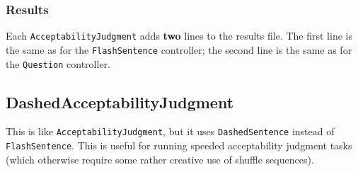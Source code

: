 \documentclass[11pt,letterpaper]{article}
\begin{document}
\normalsize

\subsubsection*{Results}

Each \texttt{AcceptabilityJudgment} adds \textbf{two} lines to the results file. The first
line is the same as for the \texttt{FlashSentence} controller; the second line is the
same as for the \texttt{Question} controller.

\subsection{DashedAcceptabilityJudgment}

This is like \texttt{AcceptabilityJudgment}, but it uses \texttt{DashedSentence}
instead of \texttt{FlashSentence}.  This is useful for running speeded
acceptability judgment tasks (which otherwise require some rather
creative use of shuffle sequences).
\end{document}

